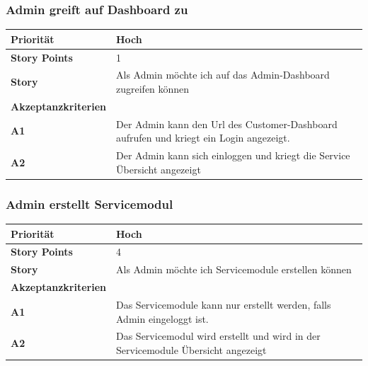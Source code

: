 \documentclass[11pt]{scrartcl}
\begin{document}
 \subsubsection{Admin greift auf Dashboard zu}
\begin{tabularx}{\linewidth}{l X}
  \textbf{Priorität} & Hoch\\
  \hline
  \textbf{Story Points} & 1\\
  \hline
  \textbf{Story}& Als Admin möchte ich auf das Admin-Dashboard zugreifen können\\
  \hline
    \textbf{Akzeptanzkriterien} & \\
    \hline
  \textbf{A1} & Der Admin kann den Url des Customer-Dashboard aufrufen und 
  kriegt ein Login angezeigt.\\
  \hline
  \textbf{A2} & Der Admin kann sich einloggen und kriegt die Service Übersicht angezeigt\\
  \hline
 \end{tabularx}
 
 
  \subsubsection{Admin erstellt Servicemodul}
\begin{tabularx}{\linewidth}{l X}
  \textbf{Priorität} & Hoch\\
  \hline
  \textbf{Story Points} & 4\\
  \hline
  \textbf{Story}& Als Admin möchte ich Servicemodule erstellen können\\
  \hline
    \textbf{Akzeptanzkriterien} & \\
    \hline
  \textbf{A1} & Das Servicemodule kann nur erstellt werden, falls Admin eingeloggt ist.\\
  \hline
  \textbf{A2} & Das Servicemodul wird erstellt und wird in der Servicemodule Übersicht angezeigt\\
  \hline
 \end{tabularx}
 
\end{document}
